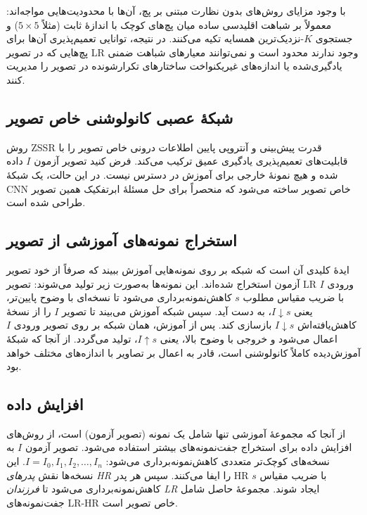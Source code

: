 با وجود مزایای روش‌های بدون نظارت مبتنی بر پچ، آن‌ها با محدودیت‌هایی
مواجه‌اند: معمولاً بر شباهت اقلیدسی ساده میان پچ‌های کوچک با
اندازهٔ ثابت (مثلاً $5\times5$) و جستجوی $K$-نزدیک‌ترین همسایه
تکیه می‌کنند. در نتیجه، توانایی تعمیم‌پذیری آن‌ها برای پچ‌هایی که در
تصویر LR وجود ندارند محدود است و نمی‌توانند معیارهای شباهت ضمنی
یادگیری‌شده یا اندازه‌های غیریکنواخت ساختارهای تکرارشونده در تصویر
را مدیریت کنند.

\subsection{شبکهٔ عصبی کانولوشنی خاص تصویر}
\label{subsec:image_specific_cnn}

روش ZSSR قدرت پیش‌بینی و آنتروپی پایین اطلاعات درونی خاص تصویر را با
قابلیت‌های تعمیم‌پذیری یادگیری عمیق ترکیب می‌کند. فرض کنید تصویر
آزمون $I$ داده شده و هیچ نمونهٔ خارجی برای آموزش در دسترس نیست.
در این حالت، یک شبکهٔ CNN خاص تصویر ساخته می‌شود که منحصراً
برای حل مسئلهٔ ابرتفکیک همین تصویر طراحی شده است.

\subsection{استخراج نمونه‌های آموزشی از تصویر}

ایدهٔ کلیدی آن است که شبکه بر روی نمونه‌هایی آموزش ببیند که صرفاً
از خود تصویر آزمون استخراج شده‌اند. این نمونه‌ها به‌صورت زیر تولید
می‌شوند: تصویر LR ورودی $I$ با ضریب مقیاس مطلوب $s$ کاهش‌نمونه‌برداری
می‌شود تا نسخه‌ای با وضوح پایین‌تر، یعنی $I{\downarrow s}$، به دست آید.
سپس شبکه آموزش می‌بیند تا تصویر $I$ را از نسخهٔ کاهش‌یافته‌اش
$I{\downarrow s}$ بازسازی کند. پس از آموزش، همان شبکه بر روی تصویر
ورودی $I$ اعمال می‌شود و خروجی با وضوح بالا، یعنی $I{\uparrow s}$،
تولید می‌گردد. از آنجا که شبکهٔ آموزش‌دیده کاملاً کانولوشنی است،
قادر به اعمال بر تصاویر با اندازه‌های مختلف خواهد بود.

\subsection{افزایش داده}

از آنجا که مجموعهٔ آموزشی تنها شامل یک نمونه (تصویر آزمون) است، از
روش‌های افزایش داده برای استخراج جفت‌نمونه‌های بیشتر استفاده می‌شود.
تصویر آزمون $I$ به نسخه‌های کوچک‌تر متعددی کاهش‌نمونه‌برداری می‌شود:
$I = I_0, I_1, I_2, \ldots, I_n$. این نسخه‌ها نقش
\emph{پدرهای HR} را ایفا می‌کنند. سپس هر
پدر HR با ضریب مقیاس $s$ کاهش‌نمونه‌برداری می‌شود تا
\emph{فرزندان LR} ایجاد شوند. مجموعهٔ حاصل شامل
جفت‌نمونه‌های LR-HR خاص تصویر است.


